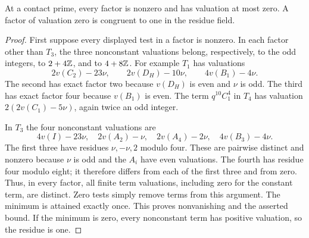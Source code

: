 \documentclass[11pt,a4paper]{article}
\begin{document}
\begin{lemma}\label{lem:residues}
At a contact prime, every factor is nonzero and has valuation at most
zero. A factor of valuation zero is congruent to one in the residue field.
\end{lemma}
\begin{proof}
First suppose every displayed test in a factor is nonzero. In each
factor other than $T_3$, the three nonconstant valuations belong,
respectively, to the odd integers, to $2+4\mathbb Z$, and to $4+8\mathbb Z$.
For example $T_1$ has valuations
\[
 2v(C_2)-23\nu,\qquad 2v(D_H)-10\nu,\qquad4v(B_1)-4\nu.
\]
The second has exact factor two because $v(D_H)$ is even and $\nu$ is
odd. The third has exact factor four because $v(B_1)$ is even.
The term $q^{10}C_1^4$ in $T_4$ has valuation
$2(2v(C_1)-5\nu)$, again twice an odd integer.

In $T_3$ the four nonconstant valuations are
\[
 4v(I)-23\nu,\quad 2v(A_2)-\nu,\quad
 2v(A_4)-2\nu,\quad4v(B_3)-4\nu.
\]
The first three have residues $\nu,-\nu,2$ modulo four. These are
pairwise distinct and nonzero because $\nu$ is odd and the $A_i$
have even valuations. The fourth has residue four modulo eight;
it therefore differs from each of the first three and from zero.
Thus, in every factor, all finite term valuations, including zero
for the constant term, are distinct. Zero tests simply remove terms
from this argument. The minimum is attained exactly once. This proves
nonvanishing and the asserted bound. If the minimum is zero, every
nonconstant term has positive valuation, so the residue is one.
\end{proof}
\end{document}
